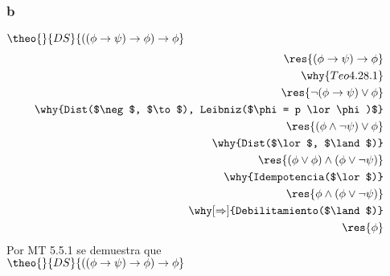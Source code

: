 \documentclass{article}
\begin{document}
\subsubsection{b}
\begin{logicenv}{$\theo{}{DS}{((\phi \to \psi) \to \phi) \to \phi}$}
    \begin{align*}
            \res{(\phi \to \psi) \to \phi}\\
        \why{Teo 4.28.1}\\
            \res{\neg(\phi \to \psi) \lor \phi}\\
        \why{Dist($\neg$, $\to$), Leibniz($\phi = p \lor \phi)$}\\
            \res{(\phi \land \neg \psi) \lor \phi}\\
        \why{Dist($\lor$, $\land$)}\\
            \res{(\phi \lor \phi) \land (\phi \lor \neg \psi)}\\
        \why{Idempotencia($\lor$)}\\
            \res{\phi \land (\phi \lor \neg \psi)}\\
        \why[\Rightarrow]{Debilitamiento($\land$)}\\
            \res{\phi}
    \end{align*}
    Por MT 5.5.1 se demuestra que\\
    $\theo{}{DS}{((\phi \to \psi) \to \phi) \to \phi}$
\end{logicenv}
\end{document}
